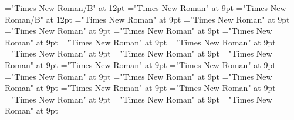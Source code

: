 \documentclass[gps1,twoside]{article}
\begin{document}
\font\spanbzhheadwordconfigtargetconfigtargetslexsensereferencelexsensereferencessensesensessensesensesentry="Times New Roman/B" at 12pt
\font\headwordconfigtargetconfigtargetslexsensereferencelexsensereferencessensesensessensesensesentrybefore="Times New Roman" at 9pt
\font\spanheadwordconfigtargetconfigtargetslexsensereferencelexsensereferencessensesensessensesensesentry="Times New Roman/B" at 12pt
\font\variantformentrybackrefvariantformentrybackrefvariantformentrybackrefssensesensessensesensesentrybefore="Times New Roman" at 9pt
\font\variantformentrybackrefssensesensessensesensesentrybefore="Times New Roman" at 9pt
\font\variantformentrybackrefssensesensessensesensesentryafter="Times New Roman" at 9pt
\font\variantentrytypevariantentrytypevariantentrytypesvariantformentrybackrefvariantformentrybackrefssensesensessensesensesentrybefore="Times New Roman" at 9pt
\font\variantentrytypesvariantformentrybackrefvariantformentrybackrefssensesensessensesensesentryafter="Times New Roman" at 9pt
\font\reverseabbrvariantentrytypevariantentrytypesvariantformentrybackrefvariantformentrybackrefssensesensessensesensesentrybefore="Times New Roman" at 9pt
\font\spanreverseabbrvariantentrytypevariantentrytypesvariantformentrybackrefvariantformentrybackrefssensesensessensesensesentrylastchildafter="Times New Roman" at 9pt
\font\headwordvariantformentrybackrefvariantformentrybackrefssensesensessensesensesentrybefore="Times New Roman" at 9pt
\font\owningentrysummarydefinitionvariantformentrybackrefvariantformentrybackrefssensesensessensesensesentrybefore="Times New Roman" at 9pt
\font\spanowningentrysummarydefinitionvariantformentrybackrefvariantformentrybackrefssensesensessensesensesentrylastchildafter="Times New Roman" at 9pt
\font\scientificnamesensesensessensesensesentryafter="Times New Roman" at 9pt
\font\semanticdomainsemanticdomainsemanticdomainssensesensessensesensesentrybefore="Times New Roman" at 9pt
\font\semanticdomainssensesensessensesensesentrybefore="Times New Roman" at 9pt
\font\semanticdomainssensesensessensesensesentryafter="Times New Roman" at 9pt
\font\abbreviationsemanticdomainsemanticdomainssensesensessensesensesentrybefore="Times New Roman" at 9pt
\font\spanabbreviationsemanticdomainsemanticdomainssensesensessensesensesentrylastchildafter="Times New Roman" at 9pt
\font\namesemanticdomainsemanticdomainssensesensessensesensesentrybefore="Times New Roman" at 9pt
\font\academicdomainacademicdomainacademicdomainssensesensessensesensesentrybefore="Times New Roman" at 9pt
\font\academicdomainssensesensessensesensesentrybefore="Times New Roman" at 9pt
\font\academicdomainssensesensessensesensesentryafter="Times New Roman" at 9pt
\end{document}
